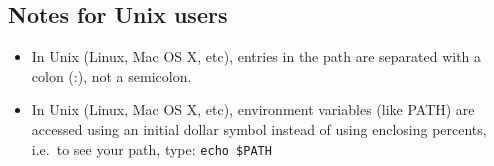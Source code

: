 \documentclass{article}
\begin{document}

\subsection{Notes for Unix users}
\label{sec:notes-unix-users}

\begin{itemize}
\item In Unix (Linux, Mac OS X, etc), entries in the path are
  separated with a colon (:), not a semicolon.
\item In Unix (Linux, Mac OS X, etc), environment variables (like
  PATH) are accessed using an initial dollar symbol instead of using
  enclosing percents, i.e.~to see your path, type: \verb+echo $PATH+
\end{itemize}
\end{document}
